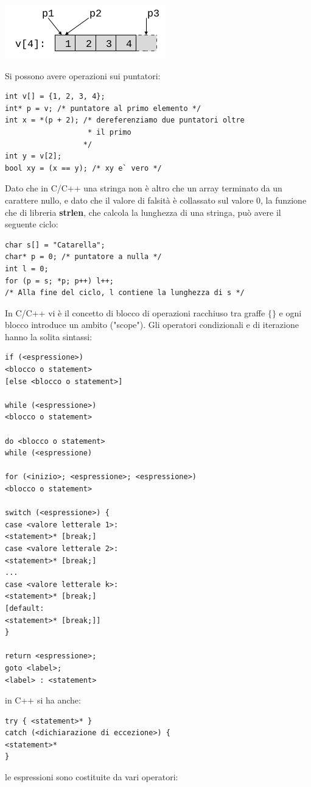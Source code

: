 \documentclass[a4paper,12pt, oneside]{book}
\begin{document}
\begin{center}
\includegraphics[scale=3]{img/c3.png}
\end{center}
Si possono avere operazioni sui puntatori:
\begin{verbatim}
int v[] = {1, 2, 3, 4};
int* p = v; /* puntatore al primo elemento */
int x = *(p + 2); /* dereferenziamo due puntatori oltre
                   * il primo
                  */
int y = v[2];
bool xy = (x == y); /* xy e` vero */
\end{verbatim}
Dato che in C/C++ una stringa non è altro che un array
terminato da un carattere nullo, e dato che il valore di falsità è collassato sul valore 0, la funzione che di libreria \textbf{strlen}, che calcola la lunghezza di una stringa, può avere il seguente ciclo:
\begin{verbatim}
char s[] = "Catarella";
char* p = 0; /* puntatore a nulla */
int l = 0;
for (p = s; *p; p++) l++;
/* Alla fine del ciclo, l contiene la lunghezza di s */
\end{verbatim}
In C/C++ vi è il concetto di blocco di operazioni racchiuso tra graffe $\{\}$ e ogni blocco introduce un ambito ("scope"). Gli operatori condizionali e di iterazione hanno la solita sintassi:
\begin{verbatim}
if (<espressione>)
<blocco o statement>
[else <blocco o statement>]

while (<espressione>)
<blocco o statement>

do <blocco o statement>
while (<espressione)

for (<inizio>; <espressione>; <espressione>)
<blocco o statement>

switch (<espressione>) {
case <valore letterale 1>:
<statement>* [break;]
case <valore letterale 2>:
<statement>* [break;]
...
case <valore letterale k>:
<statement>* [break;]
[default:
<statement>* [break;]]
}

return <espressione>;
goto <label>;
<label> : <statement>
\end{verbatim}
in C++ si ha anche:
\begin{verbatim}
try { <statement>* }
catch (<dichiarazione di eccezione>) {
<statement>*
}
\end{verbatim}
\newpage
le espressioni sono costituite da vari operatori:
\end{document}
